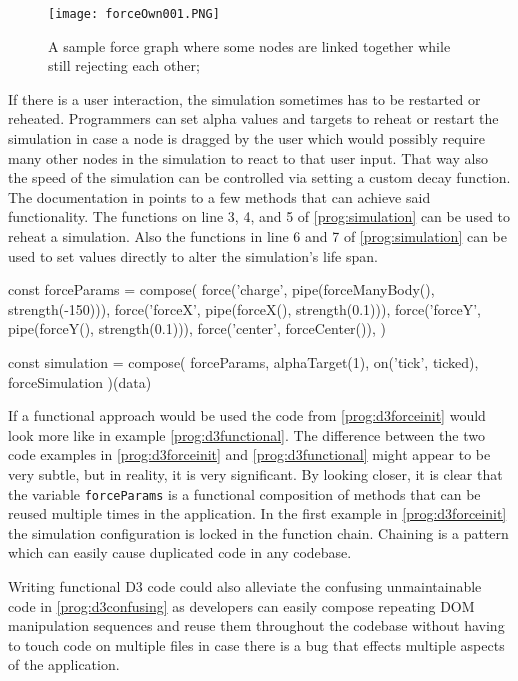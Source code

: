 \begin{figure}
  \centering
  \texttt{[image: forceOwn001.PNG]}
  \caption{A sample force graph where some nodes are linked together while still rejecting each other;}
  \label{fig:force005}
\end{figure}

If there is a user interaction, the simulation sometimes has to be restarted or reheated. Programmers can set alpha values and targets to reheat or restart the simulation in case a node is dragged by the user which would possibly require many other nodes in the simulation to react to that user input. That way also the speed of the simulation can be controlled via setting a custom decay function. The documentation in \cite[/d3-force/blob/master/README.md]{D3Github} points to a few methods that can achieve said functionality. The functions on line 3, 4, and 5 of \ref{prog:simulation} can be used to reheat a simulation. Also the functions in line 6 and 7 of \ref{prog:simulation} can be used to set values directly to alter the simulation's life span.

\begin{program}
\caption{D3 written in a fictional functional way}
\label{prog:d3functional}
\begin{JsCode}
const forceParams = compose(
  force('charge', pipe(forceManyBody(), strength(-150))),
  force('forceX', pipe(forceX(), strength(0.1))),
  force('forceY', pipe(forceY(), strength(0.1))),
  force('center', forceCenter()),
)

const simulation = compose(
  forceParams,
  alphaTarget(1),
  on('tick', ticked),
  forceSimulation
)(data)
\end{JsCode}
\end{program}

If a functional approach would be used the code from \ref{prog:d3forceinit} would look more like in example \ref{prog:d3functional}. The difference between the two code examples in \ref{prog:d3forceinit} and \ref{prog:d3functional} might appear to be very subtle, but in reality, it is very significant. By looking closer, it is clear that the variable \texttt{forceParams} is a functional composition of methods that can be reused multiple times in the application. In the first example in \ref{prog:d3forceinit} the simulation configuration is locked in the function chain. Chaining is a pattern which can easily cause duplicated code in any codebase. 

Writing functional D3 code could also alleviate the confusing unmaintainable code in \ref{prog:d3confusing} as developers can easily compose repeating DOM manipulation sequences and reuse them throughout the codebase without having to touch code on multiple files in case there is a bug that effects multiple aspects of the application.
